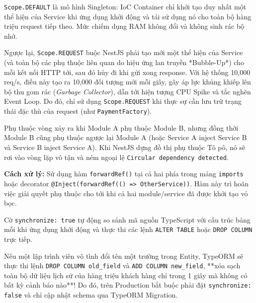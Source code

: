 \documentclass[12pt,a4paper,oneside]{book}
\begin{document}
\begin{qnabox}
  \texttt{Scope.DEFAULT} là mô hình Singleton: IoC Container chỉ khởi tạo duy nhất một thể hiện của Service khi ứng dụng khởi động và tái sử dụng nó cho toàn bộ hàng triệu request tiếp theo. Mức chiếm dụng RAM không đổi và không sinh rác bộ nhớ.
  
  Ngược lại, \texttt{Scope.REQUEST} buộc NestJS phải tạo mới một thể hiện của Service (và toàn bộ các phụ thuộc liên quan do hiệu ứng lan truyền *Bubble-Up*) cho mỗi kết nối HTTP tới, sau đó hủy đi khi gửi xong response. Với hệ thống 10,000 req/s, điều này tạo ra 10,000 đối tượng mới mỗi giây, gây áp lực khủng khiếp lên bộ thu gom rác (\textit{Garbage Collector}), dẫn tới hiện tượng CPU Spike và tắc nghẽn Event Loop. Do đó, chỉ sử dụng \texttt{Scope.REQUEST} khi thực sự cần lưu trữ trạng thái đặc thù của request (như \texttt{PaymentFactory}).
\end{qnabox}

\begin{qnabox}
  Phụ thuộc vòng xảy ra khi Module A phụ thuộc Module B, nhưng đồng thời Module B cũng phụ thuộc ngược lại Module A (hoặc Service A inject Service B và Service B inject Service A). Khi NestJS dựng đồ thị phụ thuộc Tô pô, nó sẽ rơi vào vòng lặp vô tận và ném ngoại lệ \texttt{Circular dependency detected}.
  
  \textbf{Cách xử lý:} Sử dụng hàm \texttt{forwardRef()} tại cả hai phía trong mảng \texttt{imports} hoặc decorator \texttt{@Inject(forwardRef(() => OtherService))}. Hàm này trì hoãn việc giải quyết phụ thuộc cho tới khi cả hai module/service đã được khởi tạo vỏ bọc.
\end{qnabox}

\begin{qnabox}
  Cờ \texttt{synchronize: true} tự động so sánh mã nguồn TypeScript với cấu trúc bảng mỗi khi ứng dụng khởi động và thực thi các lệnh \texttt{ALTER TABLE} hoặc \texttt{DROP COLUMN} trực tiếp.
  
  Nếu một lập trình viên vô tình đổi tên một trường trong Entity, TypeORM sẽ thực thi lệnh \texttt{DROP COLUMN old\_field} và \texttt{ADD COLUMN new\_field}, **xóa sạch toàn bộ dữ liệu lịch sử của hàng triệu khách hàng chỉ trong 1 giây mà không có bất kỳ cảnh báo nào**! Do đó, trên Production bắt buộc phải đặt \texttt{synchronize: false} và chỉ cập nhật schema qua TypeORM Migration.
\end{qnabox}
\end{document}
